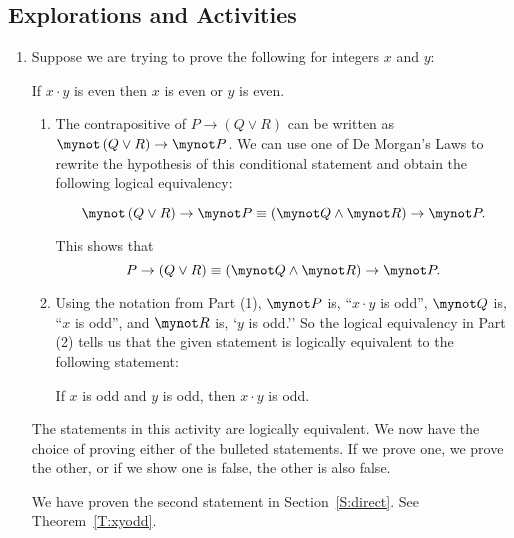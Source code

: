 \subsection*{Explorations and Activities}
\setcounter{oldenumi}{\theenumi}
\begin{enumerate} \setcounter{enumi}{\theoldenumi}
\item Suppose we are trying to prove the following for integers  $x$  and  $y$:

\begin{center}
If  $x \cdot y$  is even then  $x$  is  even  or  $y$  is even.
\end{center}

\begin{enumerate}

\item The contrapositive of  $P \to \left( {Q \vee R} \right)$ can be written as  
$\mynot  \left( {Q \vee R} \right) \to \mynot  P$.  We can use one of De Morgan's Laws to rewrite the hypothesis of this conditional statement and obtain the following logical equivalency:

\[
\mynot  \left( {Q \vee R} \right) \to \mynot  P \equiv \left( {\mynot  Q \wedge \mynot  R} \right) \to \mynot  P.
\]

This shows that
\[
P \to \left( {Q \vee R} \right) \equiv \left( {\mynot  Q \wedge \mynot  R} \right) \to \mynot  P.
\]

\item Using the notation from Part (1),  $\mynot  P$ is, ``$x \cdot y$  is odd'',  
$\mynot  Q$  is, ``$x$  is odd'', and  $\mynot  R$  is, `$y$ is odd.''  So the logical equivalency in Part (2) tells us that  the given statement is logically equivalent to the following statement:

\begin{center}
If  $x$  is  odd and  $y$  is odd, then  $x \cdot y$  is odd.
\end{center}
\end{enumerate}

The statements in this activity are logically equivalent.  We now have the choice of proving either of the bulleted statements.  If we prove one, we prove the other, or if we show one is false, the other is also false.

We have proven the second statement in Section~\ref{S:direct}.  See Theorem~\ref{T:xyodd}.


\end{enumerate}

\hbreak
\endinput
